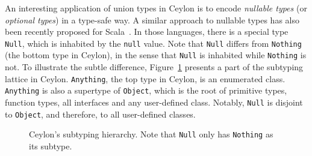 An interesting application of union types in Ceylon is to
encode \textit{nullable types} (or \textit{optional types})
\citep{gunnerson2012nullable} in a type-safe way.
A similar approach to nullable types has also been recently proposed for
Scala~\citep{nieto20nulls}. In those languages, there is a special type \lstinline{Null},
which is inhabited by the \lstinline{null} value.
Note that \lstinline{Null} differs from
\lstinline{Nothing} (the bottom type in Ceylon), in the sense that
\lstinline{Null} is inhabited while \lstinline{Nothing} is not. To illustrate
the subtle difference, Figure~\ref{fig:null} presents a part of the subtyping
lattice in Ceylon. \lstinline{Anything}, the top type in Ceylon, is an
enumerated class. \lstinline{Anything} is also a supertype of
\lstinline{Object}, which is the root of primitive types, function types, all
interfaces and any user-defined class. Notably, \lstinline{Null} is disjoint to
\lstinline{Object}, and therefore, to all user-defined classes.

\begin{figure}[t]
\begin{center}
\end{center}
\caption{Ceylon's subtyping hierarchy. Note that \lstinline{Null} only has \lstinline{Nothing} as its subtype.}
\label{fig:null}
\end{figure}

